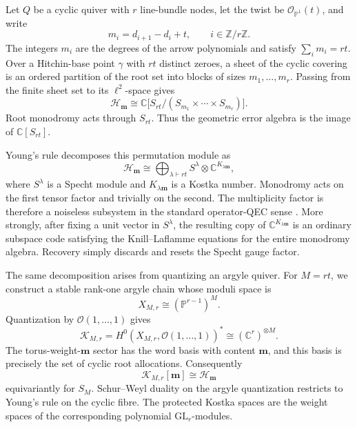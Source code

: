 \documentclass[11pt]{article}
\theoremstyle{definition}
\theoremstyle{remark}
\newcommand{\C}{\mathbb C}
\newcommand{\Z}{\mathbb Z}
\newcommand{\Pp}{\mathbb P}
\newcommand{\cH}{\mathcal H}
\newcommand{\cK}{\mathcal K}
\newcommand{\cO}{\mathcal O}
\begin{document}
Let $Q$ be a cyclic quiver with $r$ line-bundle nodes, let the twist be $\cO_{\Pp^1}(t)$, and write
\[
  m_i=d_{i+1}-d_i+t,\qquad i\in\Z/r\Z.
\]
The integers $m_i$ are the degrees of the arrow polynomials and satisfy $\sum_i m_i=rt$.  Over a Hitchin-base point $\gamma$ with $rt$ distinct zeroes, a sheet of the cyclic covering is an ordered partition of the root set into blocks of sizes $m_1,\ldots,m_r$.  Passing from the finite sheet set to its $\ell^2$-space gives
\[
 \cH_{\boldsymbol m}
 \cong \C\big[S_{rt}/(S_{m_1}\times\cdots\times S_{m_r})\big].
\]
Root monodromy acts through $S_{rt}$.  Thus the geometric error algebra is the image of $\C[S_{rt}]$.

Young's rule decomposes this permutation module as
\begin{equation}\label{eq:intro-young}
 \cH_{\boldsymbol m}
 \cong
 \bigoplus_{\lambda\vdash rt} S^\lambda\otimes \C^{K_{\lambda\boldsymbol m}},
\end{equation}
where $S^\lambda$ is a Specht module and $K_{\lambda\boldsymbol m}$ is a Kostka number.  Monodromy acts on the first tensor factor and trivially on the second.  The multiplicity factor is therefore a noiseless subsystem in the standard operator-QEC sense \cite{KnillLaflamme1997,KribsLaflammePoulinLesosky2006,NielsenPoulin2007}.  More strongly, after fixing a unit vector in $S^\lambda$, the resulting copy of $\C^{K_{\lambda\boldsymbol m}}$ is an ordinary subspace code satisfying the Knill--Laflamme equations for the entire monodromy algebra.  Recovery simply discards and resets the Specht gauge factor.

The same decomposition arises from quantizing an argyle quiver.  For $M=rt$, we construct a stable rank-one argyle chain whose moduli space is
\[
  X_{M,r}\cong (\Pp^{r-1})^M.
\]
Quantization by $\cO(1,\ldots,1)$ gives
\[
  \cK_{M,r}=H^0(X_{M,r},\cO(1,\ldots,1))^*
  \cong (\C^r)^{\otimes M}.
\]
The torus-weight-$\boldsymbol m$ sector has the word basis with content $\boldsymbol m$, and this basis is precisely the set of cyclic root allocations.  Consequently
\begin{equation}\label{eq:intro-bridge}
  \cK_{M,r}[\boldsymbol m]\cong \cH_{\boldsymbol m}
\end{equation}
equivariantly for $S_M$.  Schur--Weyl duality on the argyle quantization restricts to Young's rule on the cyclic fibre.  The protected Kostka spaces are the weight spaces of the corresponding polynomial $\mathrm{GL}_r$-modules.
\end{document}
